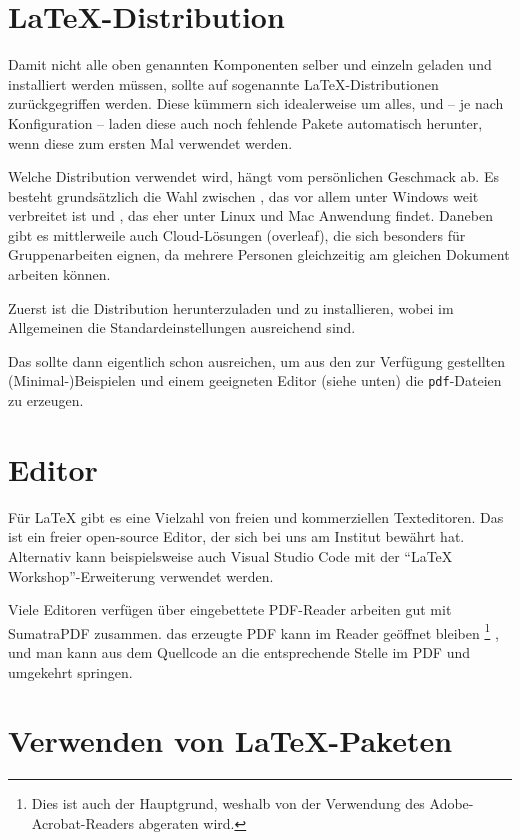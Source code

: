 \section{\LaTeX-Distribution}
\label{sec:Distribution}

Damit nicht alle oben genannten Komponenten selber und einzeln geladen und installiert werden müssen, sollte auf sogenannte \LaTeX-Distributionen zurückgegriffen werden.
Diese kümmern sich idealerweise um alles, und -- je nach Konfiguration -- laden diese auch noch fehlende Pakete automatisch herunter, wenn diese zum ersten Mal verwendet werden.

Welche Distribution verwendet wird, hängt vom persönlichen Geschmack ab.
Es besteht grundsätzlich die Wahl zwischen \Miktex{}, das vor allem unter Windows weit verbreitet ist und \texlive{}, das eher unter Linux und Mac Anwendung findet.
Daneben gibt es mittlerweile auch Cloud-Lösungen (overleaf), die sich besonders für Gruppenarbeiten eignen, da mehrere Personen gleichzeitig am gleichen Dokument arbeiten können.

Zuerst ist die Distribution herunterzuladen und zu installieren, wobei im Allgemeinen die Standardeinstellungen ausreichend sind.

Das sollte dann eigentlich schon ausreichen, um aus den zur Verfügung gestellten (Minimal-)Beispielen und einem geeigneten Editor (siehe unten) die \verb|pdf|-Dateien zu erzeugen.


\section{Editor}
Für \LaTeX{} gibt es eine Vielzahl von freien und kommerziellen Texteditoren.
Das \Texstudio ist ein freier open-source Editor, der sich bei uns am Institut bewährt hat.
Alternativ kann beispielsweise auch Visual Studio Code mit der "`LaTeX Workshop"'-Erweiterung verwendet werden.

Viele Editoren verfügen über eingebettete PDF-Reader \bzw arbeiten gut \zB mit SumatraPDF zusammen.
\Dah das erzeugte PDF kann im Reader geöffnet bleiben%
\footnote{Dies ist auch der Hauptgrund, weshalb von der Verwendung des Adobe-Acrobat-Readers abgeraten wird.}%
, und man kann aus dem Quellcode an die entsprechende Stelle im PDF und umgekehrt springen.




\section{Verwenden von \LaTeX-Paketen}

